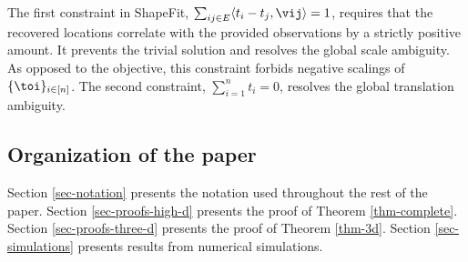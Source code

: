 The first constraint in ShapeFit, $\sum_{ij \in E} \langle t_i - t_j, \vij \rangle = 1$, requires that the recovered locations correlate with the provided observations by a strictly positive amount.  It prevents the trivial solution and resolves the global scale ambiguity.  As opposed to the objective, this constraint forbids negative scalings of $\{\toi\}_{i \in [n]}$.  The second constraint, $\sum_{i=1}^n t_i = 0$,  resolves the global translation ambiguity.










\subsection{Organization of the paper}
Section \ref{sec-notation} presents the notation used throughout the rest of the paper.   Section \ref{sec-proofs-high-d} presents the proof of Theorem \ref{thm-complete}.  Section \ref{sec-proofs-three-d} presents the proof of Theorem \ref{thm-3d}. Section \ref{sec-simulations} presents results from numerical simulations.


